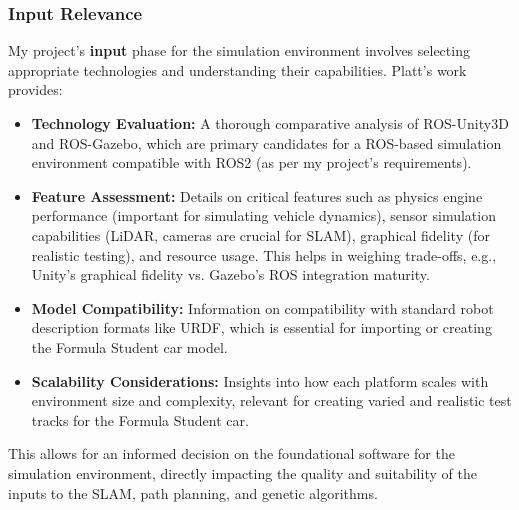\subsubsection{Input Relevance}
My project's \textbf{input} phase for the simulation environment involves selecting appropriate technologies and understanding their capabilities.
Platt's work provides:
\begin{itemize}
    \item \textbf{Technology Evaluation:} A thorough comparative analysis of ROS-Unity3D and ROS-Gazebo, which are primary candidates for a ROS-based simulation environment compatible with ROS2 (as per my project's requirements).
    \item \textbf{Feature Assessment:} Details on critical features such as physics engine performance (important for simulating vehicle dynamics), sensor simulation capabilities (LiDAR, cameras are crucial for SLAM), graphical fidelity (for realistic testing), and resource usage.
    This helps in weighing trade-offs, e.g., Unity's graphical fidelity vs.
    Gazebo's ROS integration maturity.
    \item \textbf{Model Compatibility:} Information on compatibility with standard robot description formats like URDF, which is essential for importing or creating the Formula Student car model.
    \item \textbf{Scalability Considerations:} Insights into how each platform scales with environment size and complexity, relevant for creating varied and realistic test tracks for the Formula Student car.
\end{itemize}
This allows for an informed decision on the foundational software for the simulation environment, directly impacting the quality and suitability of the inputs to the SLAM, path planning, and genetic algorithms.

